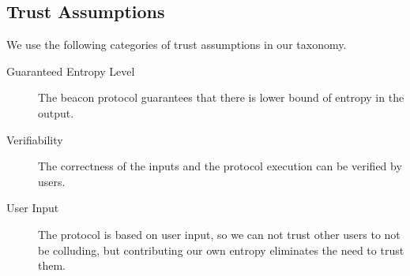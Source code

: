 \subsection{Trust Assumptions}
\label{sub:trust_assumptions}
We use the following categories of trust assumptions in our taxonomy. 
\begin{description}
    \item [Guaranteed Entropy Level] The beacon protocol guarantees that there is lower bound of entropy in the output.
    \item [Verifiability] The correctness of the inputs and the protocol execution can be verified by users.
    \item [User Input] The protocol is based on user input, so we can not trust other users to not be colluding, but contributing our own entropy eliminates the need to trust them.
\end{description}
